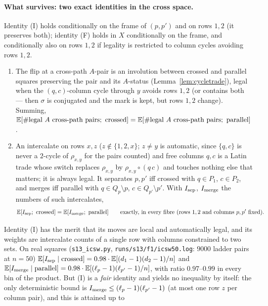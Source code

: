 \paragraph{What survives: two exact identities in the cross space.}
Identity (I) holds conditionally on the frame of $(p,p')$ and on rows
$1,2$ (it preserves both); identity (F) holds in $X$ conditionally on
the frame, and conditionally also on rows $1,2$ if legality is
restricted to column cycles avoiding rows $1,2$.
\begin{enumerate}[leftmargin=2em]
\item[(F)] The flip at a cross-path $A$-pair is an involution between
crossed and parallel squares preserving the pair and its $A$-status
(Lemma~\ref{lem:cycletrade}), legal when the $(q,c)$-column cycle
through $y$ avoids rows $1,2$ (or contains both --- then $\sigma$ is
conjugated and the mark is kept, but rows $1,2$ change).  Summing,
$\E[\#\text{legal $A$ cross-path pairs};\ \mathrm{crossed}]
=\E[\#\text{legal $A$ cross-path pairs};\ \mathrm{parallel}]$.
\item[(I)] An intercalate on rows $x,z$ ($z\notin\{1,2,x\}$;
$z\ne y$ is automatic, since $\{q,c\}$ is never a $2$-cycle of
$\rho_{x,y}$ for the pairs counted) and free columns $q,c$ is a Latin
trade whose switch replaces $\rho_{x,y}$ by $\rho_{x,y}\circ(q\,c)$
and touches nothing else that matters; it is always legal.  It
separates $p,p'$ iff crossed with $q\in P_1$, $c\in P_2$, and merges
iff parallel with $q\in Q_p\setminus p$, $c\in Q_{p'}\setminus p'$.
With $I_{\rm sep}$, $I_{\rm merge}$ the numbers of such intercalates,
\begin{equation}\label{eq:icid}
\mathbb{E}[I_{\rm sep};\ \mathrm{crossed}]=\mathbb{E}[I_{\rm merge};\ \mathrm{parallel}]
\qquad\text{exactly, in every fibre (rows $1,2$ and columns $p,p'$ fixed).}
\end{equation}
\end{enumerate}
Identity (I) has the merit that its moves are local and automatically
legal, and its weights are intercalate counts of a single row with
columns constrained to two sets.  On real squares (\texttt{s13\_icsw.py},
\texttt{runs/s13/f1/icsw50.log}: $9000$ ladder pairs at $n=50$)
$\mathbb{E}[I_{\rm sep}\mid\mathrm{crossed}]=0.98\cdot\mathbb{E}[(d_1-1)(d_2-1)/n]$ and
$\mathbb{E}[I_{\rm merge}\mid\mathrm{parallel}]=0.98\cdot\mathbb{E}[(\ell_p-1)(\ell_{p'}-1)/n]$,
with ratio $0.97$--$0.99$ in every bin of the product.  But (I) is a
\emph{fair} identity and yields no inequality by itself: the only
deterministic bound is $I_{\rm merge}\le(\ell_p-1)(\ell_{p'}-1)$ (at
most one row $z$ per column pair), and this is attained up to

